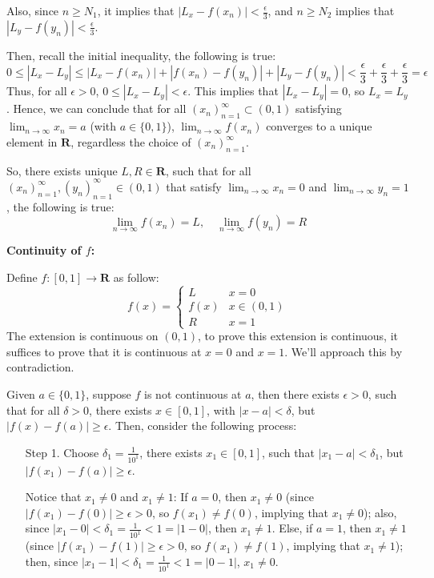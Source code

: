 \documentclass{article}
\begin{document}
\begin{itemize}
    Also, since $n \geq N_1$, it implies that $|L_x-f(x_n)| < \frac{\epsilon}{3}$, and $n \geq N_2$ implies that $|L_y -f(y_n)| < \frac{\epsilon}{3}$.

    Then, recall the initial inequality, the following is true:
    $$0 \leq |L_x-L_y| \leq |L_x-f(x_n)| + |f(x_n)-f(y_n)| + |L_y - f(y_n)| < \frac{\epsilon}{3}+\frac{\epsilon}{3}+\frac{\epsilon}{3}=\epsilon$$
    Thus, for all $\epsilon>0$, $0 \leq |L_x-L_y| < \epsilon$. This implies that $|L_x-L_y| = 0$, so $L_x = L_y$. Hence, we can conclude that for all $(x_n)_{n=1}^{\infty} \subset (0,1)$ satisfying $\lim_{n \rightarrow \infty}x_n = a$ (with $a \in \{0,1\}$), $\lim_{n \rightarrow \infty}f(x_n)$  converges to a unique element in $\mathbf{R}$, regardless the choice of $(x_n)_{n=1}^{\infty}$. 

    So, there exists unique $L, R \in \mathbf{R}$, such that for all $(x_n)_{n=1}^{\infty}, (y_n)_{n=1}^{\infty} \in (0,1)$ that satisfy $\lim_{n\rightarrow\infty}x_n = 0$ and $\lim_{n\rightarrow\infty}y_n = 1$, the following is true:
    $$\lim_{n\rightarrow \infty}f(x_n) = L,\quad \lim_{n\rightarrow \infty}f(y_n) = R$$

    \textbf{Continuity of $f$:} 
    
    Define $f:[0,1] \rightarrow \mathbf{R}$ as follow:
    $$f(x) = \begin{cases}
        L & x =0\\
        f(x) & x \in (0,1)\\
        R & x=1
    \end{cases}$$
    The extension is continuous on $(0,1)$, to prove this extension is continuous, it suffices to prove that it is continuous at $x=0$ and $x=1$. We'll approach this by contradiction.

    Given $a \in \{0,1\}$, suppose $f$ is not continuous at $a$, then there exists $\epsilon>0$, such that for all $\delta >0$, there exists $x \in [0,1]$, with $|x-a|<\delta$, but $|f(x)-f(a)| \geq \epsilon$. Then, consider the following process:
    \begin{itemize}
        \item[Step 1.] Choose $\delta_1 = \frac{1}{10^1}$, there exists $x_1 \in [0,1]$, such that $|x_1-a| < \delta_1$, but $|f(x_1)-f(a)| \geq \epsilon$. 
        
        Notice that $x_1 \neq 0$ and $x_1 \neq 1$: If $a = 0$, then $x_1 \neq 0$ (since $|f(x_1)-f(0)| \geq \epsilon > 0$, so $f(x_1) \neq f(0)$, implying that $x_1 \neq 0$); also, since $|x_1-0| < \delta_1 = \frac{1}{10^1} < 1 = |1-0|$, then $x_1 \neq 1$. Else, if $a=1$, then $x_1 \neq 1$ (since $|f(x_1)-f(1)| \geq \epsilon > 0$, so $f(x_1) \neq f(1)$, implying that $x_1 \neq 1$); then, since $|x_1-1| < \delta_1 = \frac{1}{10^1} < 1 = |0-1|$, $x_1 \neq 0$.


\end{itemize}
\end{itemize}
\end{document}
